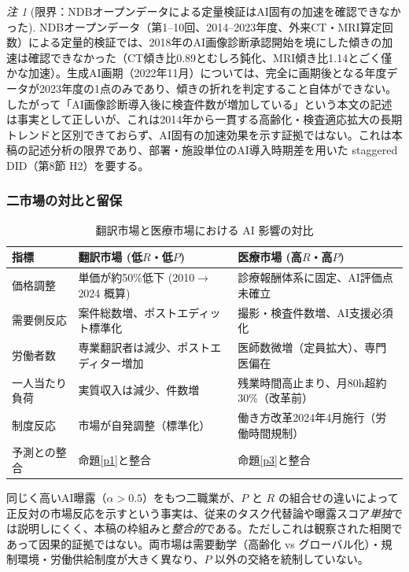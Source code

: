\documentclass[11pt]{article}
\theoremstyle{plain}
\theoremstyle{definition}
\theoremstyle{remark}
\newtheorem*{rmk}{注}
\begin{document}
\begin{rmk}[限界：NDBオープンデータによる定量検証はAI固有の加速を確認できなかった]
NDBオープンデータ（第1--10回、2014--2023年度、外来CT・MRI算定回数）による定量的検証では、2018年のAI画像診断承認開始を境にした傾きの加速は確認できなかった（CT傾き比0.89とむしろ鈍化、MRI傾き比1.14とごく僅かな加速）。生成AI画期（2022年11月）については、完全に画期後となる年度データが2023年度の1点のみであり、傾きの折れを判定すること自体ができない。したがって「AI画像診断導入後に検査件数が増加している」という本文の記述は事実として正しいが、これは2014年から一貫する高齢化・検査適応拡大の長期トレンドと区別できておらず、AI固有の加速効果を示す証拠ではない。これは本稿の記述分析の限界であり、部署・施設単位のAI導入時期差を用いた staggered DID（第8節 H2）を要する。
\end{rmk}

\subsubsection{二市場の対比と留保}
\begin{table}[h]\centering\small
\caption{翻訳市場と医療市場における AI 影響の対比}\label{tab:two}
\begin{tabularx}{\textwidth}{@{}lXX@{}}
\toprule
指標 & 翻訳市場 (低$R$・低$P$) & 医療市場 (高$R$・高$P$) \\ \midrule
価格調整 & 単価が約50\%低下 (2010$\to$2024 概算) & 診療報酬体系に固定、AI評価点未確立 \\
需要側反応 & 案件総数増、ポストエディット標準化 & 撮影・検査件数増、AI支援必須化 \\
労働者数 & 専業翻訳者は減少、ポストエディター増加 & 医師数微増（定員拡大）、専門医偏在 \\
一人当たり負荷 & 実質収入は減少、件数増 & 残業時間高止まり、月80h超約30\%（改革前） \\
制度反応 & 市場が自発調整（標準化） & 働き方改革2024年4月施行（労働時間規制） \\
予測との整合 & 命題\ref{p1}と整合 & 命題\ref{p3}と整合 \\
\bottomrule
\end{tabularx}
\end{table}

同じく高いAI曝露（$\alpha>0.5$）をもつ二職業が、$P$ と $R$ の組合せの違いによって正反対の市場反応を示すという事実は、従来のタスク代替論や曝露スコア\emph{単独}では説明しにくく、本稿の枠組みと\emph{整合的}である。ただしこれは観察された相関であって因果的証拠ではない。両市場は需要動学（高齢化 vs グローバル化）・規制環境・労働供給制度が大きく異なり、$P$ 以外の交絡を統制していない。
\end{document}
